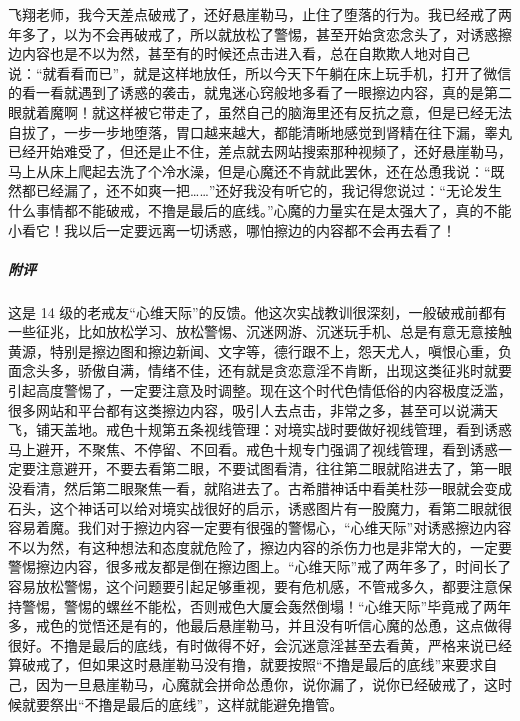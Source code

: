 \begin{case}
    飞翔老师，我今天差点破戒了，还好悬崖勒马，止住了堕落的行为。我已经戒了两年多了，以为不会再破戒了，所以就放松了警惕，甚至开始贪恋念头了，对诱惑擦边内容也是不以为然，甚至有的时候还点击进入看，总在自欺欺人地对自己说：“就看看而已”，就是这样地放任，所以今天下午躺在床上玩手机，打开了微信的看一看就遇到了诱惑的袭击，就鬼迷心窍般地多看了一眼擦边内容，真的是第二眼就着魔啊！就这样被它带走了，虽然自己的脑海里还有反抗之意，但是已经无法自拔了，一步一步地堕落，胃口越来越大，都能清晰地感觉到肾精在往下漏，睾丸已经开始难受了，但还是止不住，差点就去网站搜索那种视频了，还好悬崖勒马，马上从床上爬起去洗了个冷水澡，但是心魔还不肯就此罢休，还在怂恿我说：“既然都已经漏了，还不如爽一把……”还好我没有听它的，我记得您说过：“无论发生什么事情都不能破戒，不撸是最后的底线。”心魔的力量实在是太强大了，真的不能小看它！我以后一定要远离一切诱惑，哪怕擦边的内容都不会再去看了！
    \subparagraph{附评} 这是 14 级的老戒友“心维天际”的反馈。他这次实战教训很深刻，一般破戒前都有一些征兆，比如放松学习、放松警惕、沉迷网游、沉迷玩手机、总是有意无意接触黄源，特别是擦边图和擦边新闻、文字等，德行跟不上，怨天尤人，嗔恨心重，负面念头多，骄傲自满，情绪不佳，还有就是贪恋意淫不肯断，出现这类征兆时就要引起高度警惕了，一定要注意及时调整。现在这个时代色情低俗的内容极度泛滥，很多网站和平台都有这类擦边内容，吸引人去点击，非常之多，甚至可以说满天飞，铺天盖地。戒色十规第五条视线管理：对境实战时要做好视线管理，看到诱惑马上避开，不聚焦、不停留、不回看。戒色十规专门强调了视线管理，看到诱惑一定要注意避开，不要去看第二眼，不要试图看清，往往第二眼就陷进去了，第一眼没看清，然后第二眼聚焦一看，就陷进去了。古希腊神话中看美杜莎一眼就会变成石头，这个神话可以给对境实战很好的启示，诱惑图片有一股魔力，看第二眼就很容易着魔。我们对于擦边内容一定要有很强的警惕心，“心维天际”对诱惑擦边内容不以为然，有这种想法和态度就危险了，擦边内容的杀伤力也是非常大的，一定要警惕擦边内容，很多戒友都是倒在擦边图上。“心维天际”戒了两年多了，时间长了容易放松警惕，这个问题要引起足够重视，要有危机感，不管戒多久，都要注意保持警惕，警惕的螺丝不能松，否则戒色大厦会轰然倒塌！“心维天际”毕竟戒了两年多，戒色的觉悟还是有的，他最后悬崖勒马，并且没有听信心魔的怂恿，这点做得很好。不撸是最后的底线，有时做得不好，会沉迷意淫甚至去看黄，严格来说已经算破戒了，但如果这时悬崖勒马没有撸，就要按照“不撸是最后的底线”来要求自己，因为一旦悬崖勒马，心魔就会拼命怂恿你，说你漏了，说你已经破戒了，这时候就要祭出“不撸是最后的底线”，这样就能避免撸管。


\end{case}
